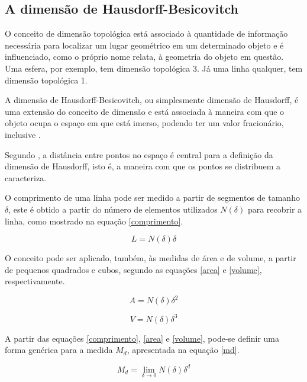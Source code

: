 \documentclass{ufscThesis}
\begin{document}
\subsection{A dimensão de Hausdorff-Besicovitch}
O conceito de dimensão topológica está associado à quantidade de informação necessária para localizar um lugar geométrico em um determinado objeto e é influenciado, como o próprio nome relata, à geometria do objeto em questão. Uma esfera, por exemplo, tem dimensão topológica 3. Já uma linha qualquer, tem dimensão topológica 1. \cite{Figueiredo2013}\par
A dimensão de Hausdorff-Besicovitch, ou simplesmente dimensão de Hausdorff, é uma extensão do conceito de dimensão e está associada à maneira com que o objeto ocupa o espaço em que está imerso, podendo ter um valor fracionário, inclusive \cite{Figueiredo2013,feder1988fractals}.\par
Segundo , a distância entre pontos no espaço é central para a definição da dimensão de Hausdorff, isto é, a maneira com que os pontos se distribuem a caracteriza.\par
O comprimento de uma linha pode ser medido a partir de segmentos de tamanho $\delta$, este é obtido a partir do número de elementos utilizados $N(\delta)$ para recobrir a linha, como mostrado na equação \ref{comprimento}.

\begin{equation}
L = N(\delta)\delta
\label{comprimento}
\end{equation}

O conceito pode ser aplicado, também, às medidas de área e de volume, a partir de pequenos quadrados e cubos, segundo as equações \ref{area} e \ref{volume}, respectivamente. 

\begin{equation}
A = N(\delta)\delta^2
\label{area}
\end{equation}

\begin{equation}
V = N(\delta)\delta^3
\label{volume}
\end{equation}

A partir das equações \ref{comprimento}, \ref{area} e \ref{volume}, pode-se definir uma forma genérica para a medida $M_{d}$, apresentada na equação \ref{md}. 

\begin{equation}
M_{d} = \lim_{\delta\rightarrow 0} N(\delta) \delta^{d}
\label{md}
\end{equation}
\end{document}
